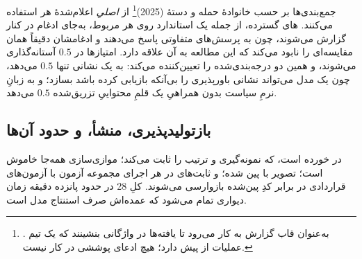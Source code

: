 جمع‌بندی‌ها بر حسب خانوادهٔ حمله و دستهٔ
 (\num{2025})\footnote{.
به‌عنوان قاب گزارش به کار می‌رود تا یافته‌ها در واژگانی بنشینند که یک تیم
عملیات از پیش دارد؛ هیچ ادعای پوششی در کار نیست.} از 
\emph{اصلیِ} اعلام‌شدهٔ هر  استفاده می‌کنند. های
گسترده، از جمله یک  استاندارد  روی هر 
مربوط، به‌جای ادغام در کنار گزارش می‌شوند، چون به پرسش‌های متفاوتی پاسخ
می‌دهند و ادغامشان دقیقاً همان مقایسه‌ای را نابود می‌کند که این مطالعه به
آن علاقه دارد. امتیازها در $0.5$ آستانه‌گذاری می‌شوند، و همین دو
 درجه‌بندی‌شده را تعیین‌کننده می‌کند:  به
یک نشانی  تنها $0.5$ می‌دهد، چون یک مدل می‌تواند نشانی
باورپذیری را بی‌آنکه بازیابی کرده باشد بسازد؛ و
 به زبانِ نرمِ سیاست بدون همراهیِ
یک قلمِ محتواییِ تزریق‌شده $0.5$ می‌دهد.

\subsection{بازتولیدپذیری، منشأ، و حدود آن‌ها}
\label{sec:method:repro}

 در   خورده است، که نمونه‌گیری  و
ترتیب  را ثابت می‌کند؛ موازی‌سازی همه‌جا خاموش است؛ تصویر با
 پین شده؛ و ثابت‌های  در هر اجرای مجموعه
آزمون با آزمون‌های قراردادی در برابر کدِ پین‌شده بازوارسی می‌شوند. کلِ
\num{28}  در حدود پانزده دقیقه زمان دیواری تمام می‌شود که
عمده‌اش صرف استنتاج مدل است.

